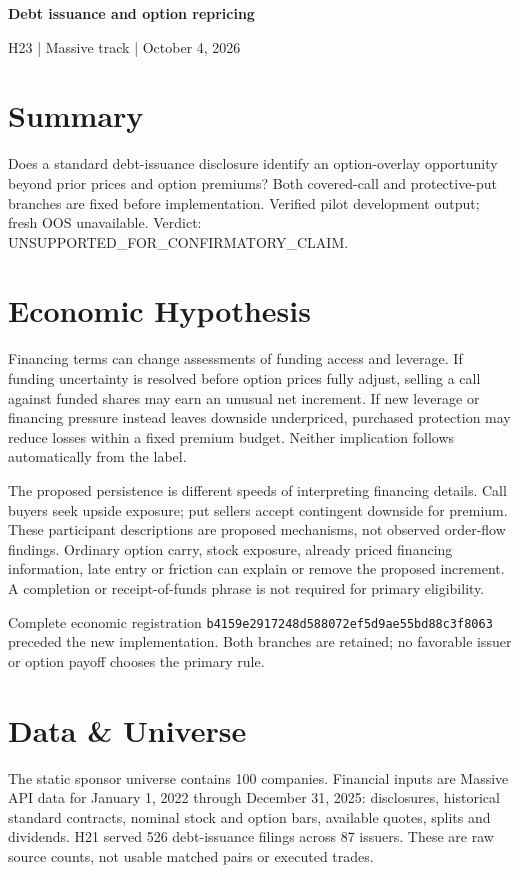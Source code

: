 \documentclass[11pt,letterpaper]{article}
\begin{document}
\begin{center}{\Large\bfseries Debt issuance and option repricing}\par\smallskip H23 | Massive track | October 4, 2026\end{center}
\section{Summary}
Does a standard debt-issuance disclosure identify an option-overlay opportunity beyond prior prices and option premiums? Both covered-call and protective-put branches are fixed before implementation. Verified pilot development output; fresh OOS unavailable. Verdict: UNSUPPORTED\_FOR\_CONFIRMATORY\_CLAIM.

\section{Economic Hypothesis}
Financing terms can change assessments of funding access and leverage. If funding uncertainty is resolved before option prices fully adjust, selling a call against funded shares may earn an unusual net increment. If new leverage or financing pressure instead leaves downside underpriced, purchased protection may reduce losses within a fixed premium budget. Neither implication follows automatically from the label.

The proposed persistence is different speeds of interpreting financing details. Call buyers seek upside exposure; put sellers accept contingent downside for premium. These participant descriptions are proposed mechanisms, not observed order-flow findings. Ordinary option carry, stock exposure, already priced financing information, late entry or friction can explain or remove the proposed increment. A completion or receipt-of-funds phrase is not required for primary eligibility.

Complete economic registration \nolinkurl{b4159e2917248d588072ef5d9ae55bd88c3f8063} preceded the new implementation. Both branches are retained; no favorable issuer or option payoff chooses the primary rule.

\section{Data \& Universe}
The static sponsor universe contains 100 companies. Financial inputs are Massive API data for January 1, 2022 through December 31, 2025: disclosures, historical standard contracts, nominal stock and option bars, available quotes, splits and dividends. H21 served 526 debt-issuance filings across 87 issuers. These are raw source counts, not usable matched pairs or executed trades.
\end{document}
